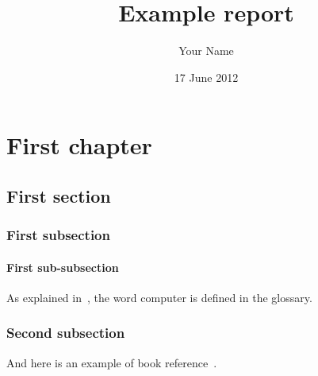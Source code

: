\documentclass[12pt]{scrreprt} %
\author{Your Name}
\title{Example report}
\date{17 June 2012}
\begin{document}
\maketitle

\tableofcontents

\chapter{First chapter}
\section{First section}
\subsection{First subsection}
\subsubsection{First sub-subsection}
As explained in~\cite{latex:website}, the word \gls{computer} is defined in the glossary.

\subsection{Second subsection}
And here is an example of book reference~\cite{kr}.


\printglossary


\end{document}
